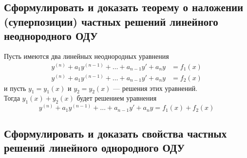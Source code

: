 \subsection{Сформулировать и доказать теорему о наложении (суперпозиции) частных решений линейного неоднородного ОДУ}

\begin{theorem*}
    Пусть имеются два линейных неоднородных уравнения
    \begin{align*}
        y^{(n)} + a_1y^{(n-1)} + \ldots + a_{n-1} y' + a_n y &= f_1(x) \\
        y^{(n)} + a_1y^{(n-1)} + \ldots + a_{n-1} y' + a_n y &= f_2(x)
    \end{align*}
    и пусть $y_1 = y_1(x)$ и $y_2 = y_2 (x)$ --- решения этих уравнений. \\
    Тогда $y_1(x) + y_2(x)$ будет решением уравнения
    \[
        y^{(n)} + a_1y^{(n-1)} + \ldots + a_{n-1} y' + a_n y = f_1(x) + f_2(x)
    \]
\end{theorem*}

\subsection{Сформулировать и доказать свойства частных решений линейного однородного ОДУ}

